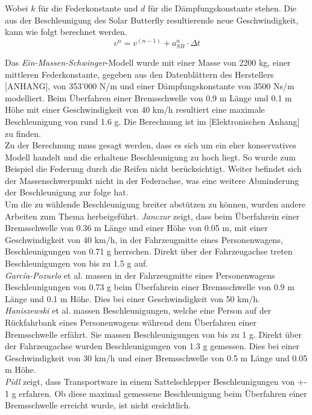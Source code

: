 \begin{description}
    Wobei $k$ für die Federkonstante und $d$ für die Dämpfungskonstante stehen.
    Die aus der Beschleunigung des Solar Butterfly resultierende neue Geschwindigkeit, kann wie folgt berechnet werden.
    \begin{equation}
      v^n = v^{(n-1)} + a_{SB}^n \cdot \Delta t
    \end{equation}

    Das \emph{Ein-Massen-Schwinger}-Modell wurde mit einer Masse von 2200 kg, einer mittleren Federkonstante, gegeben aus den Datenblättern des Herstellers [ANHANG], von 353'000 N/m und einer Dämpfungskonstante von 3500 Ns/m modelliert. Beim Überfahren einer Bremsschwelle von 0.9 m Länge und 0.1 m Höhe mit einer Geschwindigkeit von 40 km/h resultiert eine maximale Beschleunigung von rund 1.6 g. Die Berechnung ist im [Elektronischen Anhang] zu finden.\\
    Zu der Berechnung muss gesagt werden, dass es sich um ein eher konservatives Modell handelt und die erhaltene Beschleunigung zu hoch liegt. So wurde zum Beispiel die Federung durch die Reifen nicht berücksichtigt. Weiter befindet sich der Massenschwerpunkt nicht in der Federachse, was eine weitere Abminderung der Beschleunigung zur folge hat.\\

    Um die zu wählende Beschleunigung breiter abstützen zu können, wurden andere Arbeiten zum Thema herbeigeführt. \emph{Janczur} \cite{Beschl.1} zeigt, dass beim Überfahrein einer Bremsschwelle von 0.36 m Länge und einer Höhe von 0.05 m, mit einer Geschwindigkeit von 40 km/h, in der Fahrzeugmitte eines Personenwagens, Beschleunigungen von 0.71 g herrschen. Direkt über der Fahrzeugachse treten Beschleunigungen von bis zu 1.5 g auf.\\
    \emph{García-Pozuelo} et al. \cite{Beschl.2} massen in der Fahrzeugmitte eines Personenwagens Beschleunigungen von 0.73 g beim Überfahrein einer Bremsschwelle von 0.9 m Länge und 0.1 m Höhe. Dies bei einer Geschwindigkeit von 50 km/h.\\
    \emph{Haniszewski} et al. \cite{Beschl.3} massen Beschleunigungen, welche eine Person auf der Rückfahrbank eines Personenwagens während dem Überfahren einer Bremsschwelle erfährt. Sie massen Beschleunigungen von bis zu 1 g. Direkt über der Fahrzeugachse wurden Beschleunigungen von 1.3 g gemessen. Dies bei einer Geschwindigkeit von 30 km/h und einer Bremsschwelle von 0.5 m Länge und 0.05 m Höhe.\\
    \emph{Pidl} \cite{Beschl.4} zeigt, dass Transportware in einem Sattelschlepper Beschleunigungen von +- 1 g erfahren. Ob diese maximal gemessene Beschleunigung beim Überfahren einer Bremsschwelle erreicht wurde, ist nicht ersichtlich.


\end{description}
